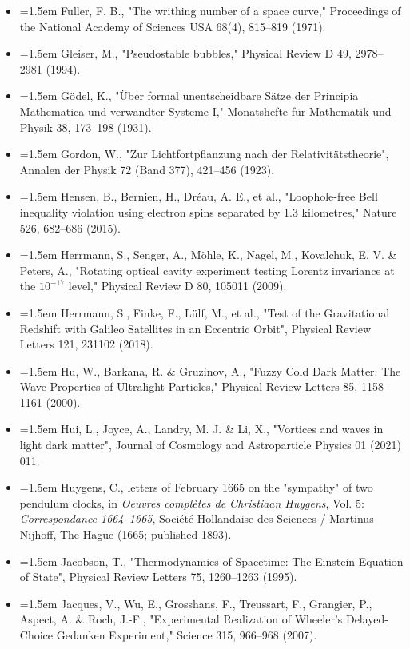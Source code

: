 \documentclass[11pt,a4paper]{article}
\begin{document}
\begin{itemize}[leftmargin=1.5em,label={}]
\item \hangindent=1.5em Fuller, F. B., "The writhing number of a space curve," Proceedings of the National Academy of Sciences USA 68(4), 815–819 (1971).
\item \hangindent=1.5em Gleiser, M., "Pseudostable bubbles," Physical Review D 49, 2978–2981 (1994).
\item \hangindent=1.5em Gödel, K., "Über formal unentscheidbare Sätze der Principia Mathematica und verwandter Systeme I," Monatshefte für Mathematik und Physik 38, 173–198 (1931).
\item \hangindent=1.5em Gordon, W., "Zur Lichtfortpflanzung nach der Relativitätstheorie", Annalen der Physik 72 (Band 377), 421–456 (1923).
\item \hangindent=1.5em Hensen, B., Bernien, H., Dréau, A. E., et al., "Loophole-free Bell inequality violation using electron spins separated by 1.3 kilometres," Nature 526, 682–686 (2015).
\item \hangindent=1.5em Herrmann, S., Senger, A., Möhle, K., Nagel, M., Kovalchuk, E. V. \& Peters, A., "Rotating optical cavity experiment testing Lorentz invariance at the $10^{-17}$ level," Physical Review D 80, 105011 (2009).
\item \hangindent=1.5em Herrmann, S., Finke, F., Lülf, M., et al., "Test of the Gravitational Redshift with Galileo Satellites in an Eccentric Orbit", Physical Review Letters 121, 231102 (2018).
\item \hangindent=1.5em Hu, W., Barkana, R. \& Gruzinov, A., "Fuzzy Cold Dark Matter: The Wave Properties of Ultralight Particles," Physical Review Letters 85, 1158–1161 (2000).
\item \hangindent=1.5em Hui, L., Joyce, A., Landry, M. J. \& Li, X., "Vortices and waves in light dark matter", Journal of Cosmology and Astroparticle Physics 01 (2021) 011.
\item \hangindent=1.5em Huygens, C., letters of February 1665 on the "sympathy" of two pendulum clocks, in \emph{Oeuvres complètes de Christiaan Huygens}, Vol. 5: \emph{Correspondance 1664–1665}, Société Hollandaise des Sciences / Martinus Nijhoff, The Hague (1665; published 1893).
\item \hangindent=1.5em Jacobson, T., "Thermodynamics of Spacetime: The Einstein Equation of State", Physical Review Letters 75, 1260–1263 (1995).
\item \hangindent=1.5em Jacques, V., Wu, E., Grosshans, F., Treussart, F., Grangier, P., Aspect, A. \& Roch, J.-F., "Experimental Realization of Wheeler's Delayed-Choice Gedanken Experiment," Science 315, 966–968 (2007).

\end{itemize}
\end{document}
